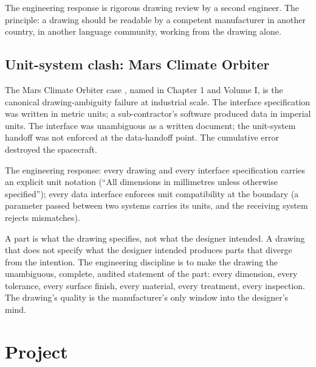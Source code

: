 The engineering response is rigorous drawing review by a second engineer. The principle: a drawing should be readable by a competent manufacturer in another country, in another language community, working from the drawing alone.

\subsection{Unit-system clash: Mars Climate Orbiter}

The Mars Climate Orbiter case \cite{acc:nasa-mco-mib}, named in Chapter 1 and Volume I, is the canonical drawing-ambiguity failure at industrial scale. The interface specification was written in metric units; a sub-contractor's software produced data in imperial units. The interface was unambiguous as a written document; the unit-system handoff was not enforced at the data-handoff point. The cumulative error destroyed the spacecraft.

The engineering response: every drawing and every interface specification carries an explicit unit notation (``All dimensions in millimetres unless otherwise specified''); every data interface enforces unit compatibility at the boundary (a parameter passed between two systems carries its units, and the receiving system rejects mismatches).

\begin{principle}
A part is what the drawing specifies, not what the designer intended. A drawing that does not specify what the designer intended produces parts that diverge from the intention. The engineering discipline is to make the drawing the unambiguous, complete, audited statement of the part: every dimension, every tolerance, every surface finish, every material, every treatment, every inspection. The drawing's quality is the manufacturer's only window into the designer's mind.
\end{principle}

\section{Project}


